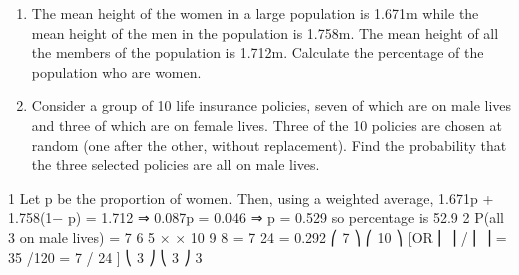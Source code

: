 \documentclass[a4paper,12pt]{article}
\begin{document}
\begin{enumerate}

\item The mean height of the women in a large population is 1.671m while the mean height of the men in the population is 1.758m. The mean height of all the members of the population is 1.712m.
Calculate the percentage of the population who are women.

\item 
Consider a group of 10 life insurance policies, seven of which are on male lives and three of which are on female lives. Three of the 10 policies are chosen at random (one after the other, without replacement).
Find the probability that the three selected policies are all on male lives.

\end{enumerate}
\newpage



1
Let p be the proportion of women.
Then, using a weighted average, 1.671p + 1.758(1− p) = 1.712
⇒ 0.087p = 0.046 ⇒ p = 0.529 so percentage is 52.9%
2
P(all 3 on male lives) =
7 6 5
× ×
10 9 8
=
7
24
= 0.292
⎛ 7 ⎞ ⎛ 10 ⎞
[OR ⎜ ⎟ / ⎜ ⎟ = 35 /120 = 7 / 24 ]
⎝ 3 ⎠ ⎝ 3 ⎠
3
\end{document}
